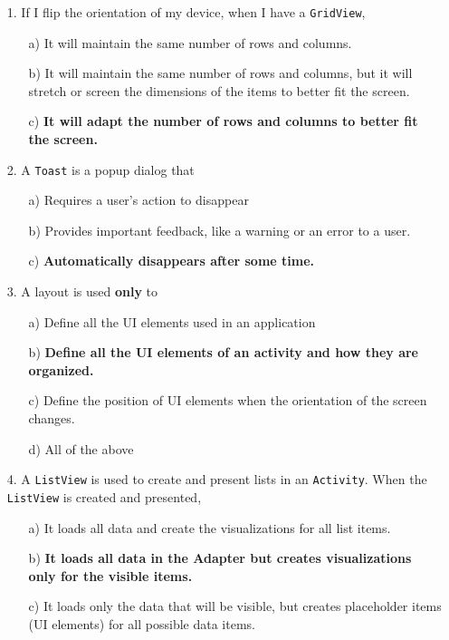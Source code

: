 \documentclass[12pt]{book}
\begin{document}
\begin{itemize}
    \item[1.] If I flip the orientation of my device, when I have a \texttt{GridView},
    \begin{itemize}
        \item[a)] It will maintain the same number of rows and columns.
        \item[b)] It will maintain the same number of rows and columns, but it will stretch or screen the dimensions of the items to better fit the screen.
        \item[c)] \textbf{It will adapt the number of rows and columns to better fit the screen.}
    \end{itemize}
    
    \item[2.] A \texttt{Toast} is a popup dialog that 
    \begin{itemize}
        \item[a)] Requires a user's action to disappear
        \item[b)] Provides important feedback, like a warning or an error to a user.
        \item[c)] \textbf{Automatically disappears after some time.}
    \end{itemize}
   
    \item[3.] A layout is used \textbf{only} to
    \begin{itemize}
        \item[a)] Define all the UI elements used in an application
        \item[b)] \textbf{Define all the UI elements of an activity and how they are organized.}
        \item[c)] Define the position of UI elements when the orientation of the screen changes.
        \item[d)] All of the above
    \end{itemize}
    
    
    \item[4.] A \texttt{ListView} is used to create and present lists in an \texttt{Activity}. When the \texttt{ListView} is created and presented,
    \begin{itemize}
        \item[a)] It loads all data and create the visualizations for all list items.
        \item[b)] \textbf{It loads all data in the Adapter but creates visualizations only for the visible items.}
        \item[c)] It loads only the data that will be visible, but creates placeholder items (UI elements) for all possible data items.
    \end{itemize}
   

\end{itemize}
\end{document}
